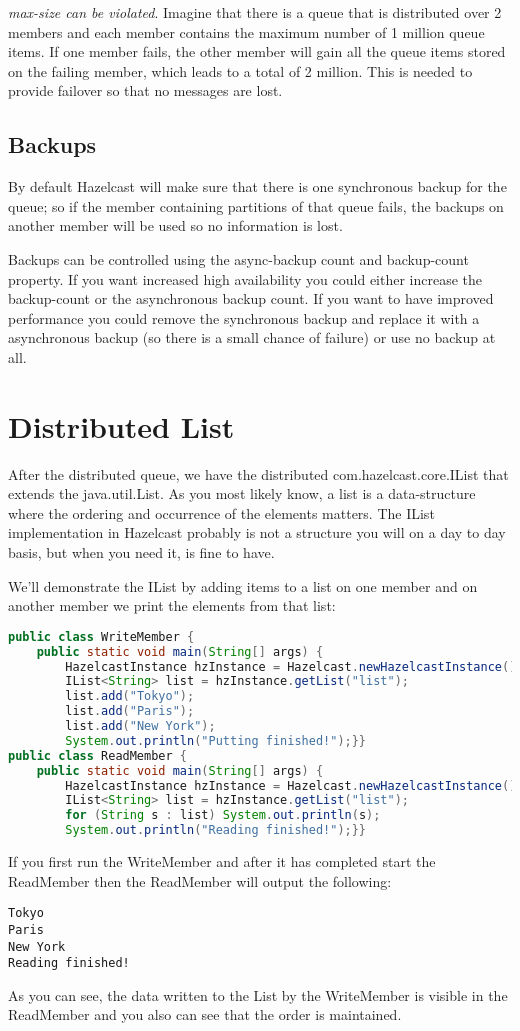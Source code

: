 \emph{max-size can be violated}. Imagine that there is a queue that is distributed over 2 members and each member contains the maximum number of 1 million queue items. If one member fails, the other member will gain all the queue items stored on the failing member, which leads to a total of 2 million. This is needed to provide failover so that no messages are lost. 

\subsection{Backups}
By default Hazelcast will make sure that there is one synchronous backup for the queue; so if the member containing partitions of that queue fails, the backups on another member will be used so no information is lost.

Backups can be controlled using the async-backup count and backup-count property. If you want increased high availability you could either increase the backup-count or the asynchronous backup count. If you want to have improved performance you could remove the synchronous backup and replace it with a asynchronous backup (so there is a small chance of failure) or use no backup at all.

\section{Distributed List}
After the distributed queue, we have the distributed com.hazelcast.core.IList that extends the java.util.List. As you most likely know, a list is a data-structure where the ordering and occurrence of the elements matters. The IList implementation in Hazelcast probably is not a structure you will on a day to day basis, but when you need it, is fine to have.

We'll demonstrate the IList by adding items to a list on one member and on another member we print the elements from that list:
\begin{lstlisting}[language=java]
public class WriteMember {
    public static void main(String[] args) {
        HazelcastInstance hzInstance = Hazelcast.newHazelcastInstance();
        IList<String> list = hzInstance.getList("list");
        list.add("Tokyo");
        list.add("Paris");
        list.add("New York");
        System.out.println("Putting finished!");}}
public class ReadMember {
    public static void main(String[] args) {
        HazelcastInstance hzInstance = Hazelcast.newHazelcastInstance();
        IList<String> list = hzInstance.getList("list");
        for (String s : list) System.out.println(s);
        System.out.println("Reading finished!");}}
\end{lstlisting}
If you first run the WriteMember and after it has completed start the ReadMember then the ReadMember will output the following:
\begin{lstlisting}
Tokyo
Paris
New York
Reading finished!
\end{lstlisting}
As you can see, the data written to the List by the WriteMember is visible in the ReadMember and you also can see that the order is maintained.

